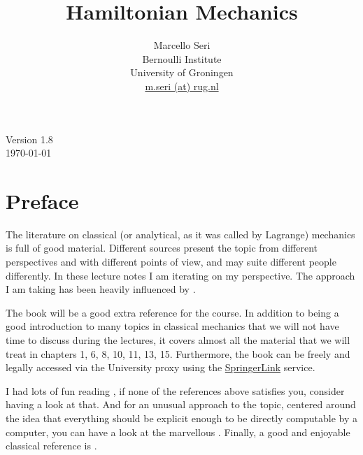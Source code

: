\documentclass[english,fontsize=11pt,paper=a5,oneside]{scrbook}
\title{Hamiltonian Mechanics}
\author{Marcello Seri\\
\small{Bernoulli Institute}\vspace{-.2cm}\\
\small{University of Groningen}\vspace{-.2cm}\\
\small\href{mailto:m.seri@rug.nl}{m.seri (at) rug.nl}
}
\date{}
\theoremstyle{definition}
\def\biblio{}
\begin{document}
\def\biblio{}

\maketitle

\cleardoublepage

\thispagestyle{empty}
\null\vfill
\begin{center}
  Version 1.8\\
  \today
\end{center}
\vfill
\small{\doclicenseThis}

\cleardoublepage

\tableofcontents

\cleardoublepage

\chapter*{Preface}

The literature on classical (or analytical, as it was called by Lagrange) mechanics is full of good material.
Different sources present the topic from different perspectives and with different points of view, and may suite different people differently.
In these lecture notes I am iterating on my perspective.
The approach I am taking has been heavily influenced by \cite{book:arnold, book:knauf, lectures:dubrovin, book:lowenstein, book:marsdenratiu, lectures:tong, landau1976mechanics}.

The book \cite{book:knauf} will be a good extra reference for the course. In addition to being a good introduction to many topics in classical mechanics that we will not have time to discuss during the lectures, it covers almost all the material that we will treat in chapters 1, 6, 8, 10, 11, 13, 15. Furthermore, the book can be freely and legally accessed via the University proxy using the \href{https://link.springer.com/book/10.1007%2F978-3-662-55774-7}{SpringerLink} service.

I had lots of fun reading \cite{schwichtenberg2019no}, if none of the references above satisfies you, consider having a look at that. And for an unusual approach to the topic, centered around the idea that everything should be explicit enough to be directly computable by a computer, you can have a look at the marvellous \cite{book:sicm}. Finally, a good and enjoyable classical reference is \cite{goldstein2013classical}.\medskip
\end{document}
